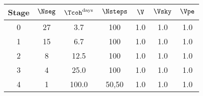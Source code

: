 \begin{tabular}{c|cccccc}
Stage & $\Nseg$ & $\Tcoh^{\rm days}$ &$\Nsteps$ & $\V$ & $\Vsky$ & $\Vpe$ \\ \hline
0 & 27 & 3.7 & 100 & 1.0 & 1.0 & 1.0 \\
1 & 15 & 6.7 & 100 & 1.0 & 1.0 & 1.0 \\
2 & 8 & 12.5 & 100 & 1.0 & 1.0 & 1.0 \\
3 & 4 & 25.0 & 100 & 1.0 & 1.0 & 1.0 \\
4 & 1 & 100.0 & 50,50 & 1.0 & 1.0 & 1.0 \\
\end{tabular}
